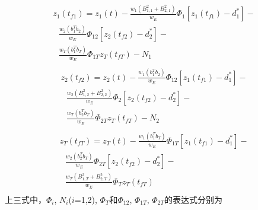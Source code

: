 \begin{equation}
\label{eq:31}
\begin{gathered}
  {z_1}({t_{f1}}) = {z_1}(t) - \frac{{{w_1}(B_{1,1}^2 + B_{2,1}^2)}}{{{w_E}}}{\Phi _1}\left[ {{z_1}({t_{f1}}) - d_1^*} \right] -  \\ 
  {\text{ }}\frac{{{w_2}\left( {b_1^T{b_2}} \right)}}{{{w_E}}}{\Phi _{12}}\left[ {{z_2}({t_{f2}}) - d_2^*} \right] -  \\ 
  {\text{ }}\frac{{{w_T}\left( {b_1^T{b_T}} \right)}}{{{w_E}}}{\Phi _{1T}}{z_T}({t_{fT}}) - {N_1} \\ 
\end{gathered}
\end{equation}
\begin{equation}
\label{eq:32}
\begin{gathered}
  {z_2}({t_{f2}}) = {z_2}(t) - \frac{{{w_1}\left( {b_1^T{b_2}} \right)}}{{{w_E}}}{\Phi _{12}}\left[ {{z_1}({t_{f1}}) - d_1^*} \right] -  \\ 
  {\text{ }}\frac{{{w_2}(B_{1,2}^2 + B_{2,2}^2)}}{{{w_E}}}{\Phi _2}\left[ {{z_2}({t_{f2}}) - d_2^*} \right] -  \\ 
  {\text{ }}\frac{{{w_T}\left( {b_2^T{b_T}} \right)}}{{{w_E}}}{\Phi _{2T}}{z_T}({t_{fT}}) - {N_2} \\ 
\end{gathered}
\end{equation}
\begin{equation}
\label{eq:33}
\begin{gathered}
  {z_T}({t_{fT}}) = {z_T}(t) - \frac{{{w_1}\left( {b_1^T{b_T}} \right)}}{{{w_E}}}{\Phi _{1T}}\left[ {{z_1}({t_{f1}}) - d_1^*} \right] -  \\ 
  {\text{ }}\frac{{{w_2}\left( {b_2^T{b_T}} \right)}}{{{w_E}}}{\Phi _{2T}}\left[ {{z_2}({t_{f2}}) - d_2^*} \right] -  \\ 
  {\text{ }}\frac{{{w_T}\left( {B_{1,T}^2 + B_{2,T}^2} \right)}}{{{w_E}}}{\Phi _T}{z_T}({t_{fT}}) \\ 
\end{gathered}
\end{equation}
上三式中，${\Phi _i}$, ${N_i}$($i$=1,2), ${\Phi _T}$和${\Phi _{12}}$, ${\Phi _{1T}}$, ${\Phi _{2T}}$的表达式分别为

